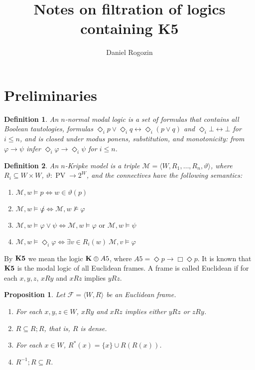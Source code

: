 \documentclass[a4paper]{article}
\author{Daniel Rogozin}
\date{}
\title{Notes on filtration of logics containing {\bf K5}}
\theoremstyle{defin}
\newtheorem{defin}{Definition}
\theoremstyle{theorem}
\theoremstyle{prop}
\newtheorem{prop}{Proposition}
\theoremstyle{lemma}
\theoremstyle{ex}
\theoremstyle{col}
\begin{document}
\maketitle

\nocite{*}

\section{Preliminaries}

\begin{defin}
  An $n$-normal modal logic is a set of formulas that contains all Boolean tautologies, formulas $\Diamond_i p \lor \Diamond_i q \leftrightarrow \Diamond_i (p \lor q)$ and $\Diamond_i \bot \leftrightarrow \bot$ for $i \leq n$, and is closed under modus ponens, substitution, and monotonicity: from $\varphi \rightarrow \psi$ infer $\Diamond_i \varphi \rightarrow \Diamond_i \psi$ for $i \leq n$.
\end{defin}

\begin{defin} An $n$-Kripke model is a triple $\mathcal{M} = \langle W, R_1, \dots, R_n, \vartheta \rangle$, where $R_i \subseteq W \times W$, $\vartheta : \operatorname{PV} \to 2^W$, and the connectives have the following semantics:

  \begin{enumerate}
    \item $\mathcal{M}, w \models p \Leftrightarrow w \in \vartheta(p)$
    \item $\mathcal{M}, w \models \not \varphi \Leftrightarrow \mathcal{M}, w \nvDash \varphi$
    \item $\mathcal{M}, w \models \varphi \lor \psi \Leftrightarrow \mathcal{M}, w \models \varphi \text{ or } \mathcal{M}, w \models \psi$
    \item $\mathcal{M}, w \models \Diamond_i \varphi \Leftrightarrow \exists v \in R_i(w) \: \mathcal{M}, v \models \varphi$
  \end{enumerate}
\end{defin}

By ${\bf K5}$ we mean the logic ${\bf K} \oplus {A5}$, where ${A5} = \Diamond p \to \Box \Diamond p$. It is known that ${\bf K5}$ is the modal logic of all Euclidean frames. A frame is called Euclidean if for each $x, y, z$, $x R y$ and $x R z$ implies $y R z$.

\begin{prop}
  Let $\mathcal{F} = \langle W, R \rangle$ be an Euclidean frame.

  \begin{enumerate}
    \item For each $x, y, z \in W$, $x R y$ and $x R z$ implies either $y R z$ or $z R y$.
    \item $R \subseteq R ; R$, that is, $R$ is dense.
    \item For each $x \in W$, $R^{*}(x) = \{ x\} \cup R(R(x))$.
    \item $R^{-1} ; R \subseteq R$.
  \end{enumerate}
\end{prop}
\end{document}

